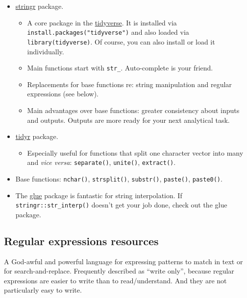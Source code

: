 \documentclass[
]{book}
\providecommand{\tightlist}{%
  \setlength{\itemsep}{0pt}\setlength{\parskip}{0pt}}
\begin{document}
\begin{itemize}
\tightlist
\item
  \href{https://stringr.tidyverse.org}{stringr} package.

  \begin{itemize}
  \tightlist
  \item
    A core package in the \href{https://tidyverse.tidyverse.org}{tidyverse}. It is installed via \texttt{install.packages("tidyverse")} and also loaded via \texttt{library(tidyverse)}. Of course, you can also install or load it individually.
  \item
    Main functions start with \texttt{str\_}. Auto-complete is your friend.
  \item
    Replacements for base functions re: string manipulation and regular expressions (see below).
  \item
    Main advantages over base functions: greater consistency about inputs and outputs. Outputs are more ready for your next analytical task.
  \end{itemize}
\item
  \href{https://tidyr.tidyverse.org}{tidyr} package.

  \begin{itemize}
  \tightlist
  \item
    Especially useful for functions that split one character vector into many and \emph{vice versa}: \texttt{separate()}, \texttt{unite()}, \texttt{extract()}.
  \end{itemize}
\item
  Base functions: \texttt{nchar()}, \texttt{strsplit()}, \texttt{substr()}, \texttt{paste()}, \texttt{paste0()}.
\item
  The \href{https://glue.tidyverse.org}{glue} package is fantastic for string interpolation. If \texttt{stringr::str\_interp()} doesn't get your job done, check out the glue package.
\end{itemize}

\hypertarget{regular-expressions-resources}{%
\subsection{Regular expressions resources}\label{regular-expressions-resources}}

A God-awful and powerful language for expressing patterns to match in text or for search-and-replace. Frequently described as ``write only'', because regular expressions are easier to write than to read/understand. And they are not particularly easy to write.
\end{document}
